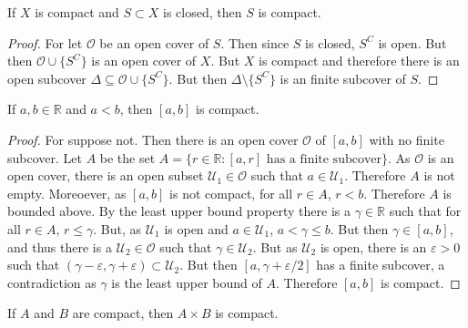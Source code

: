 \documentclass[crop=false,class=book,oneside]{standalone}                      %
\begin{document}
            \begin{theorem}
                If $X$ is compact and
                $S\subset{X}$ is closed, then
                $S$ is compact.
            \end{theorem}
            \begin{proof}
                For let $\mathcal{O}$ be an open cover
                of $S$. Then since $S$ is closed, $S^{C}$
                is open. But then $\mathcal{O}\cup\{S^{C}\}$ is an open
                cover of $X$. But $X$ is compact and therefore
                there is an open subcover $\Delta\subseteq\mathcal{O}\cup\{S^{C}\}$.
                But then $\Delta\setminus\{S^{C}\}$ is an finite subcover of $S$.
            \end{proof}
            \begin{theorem}
                If $a,b\in\mathbb{R}$ and $a<b$, then
                $[a,b]$ is compact.
            \end{theorem}
            \begin{proof}
                For suppose not. Then there is an open
                cover $\mathcal{O}$ of $[a,b]$ with no finite
                subcover. Let $A$ be the set
                $A=\{r\in\mathbb{R}:[a,r]%
                     \textrm{ has a finite subcover}\}$.
                As $\mathcal{O}$ is an open cover, there is
                an open subset $\mathcal{U}_{1}\in\mathcal{O}$ such
                that $a\in\mathcal{U}_{1}$. Therefore $A$ is
                not empty. Moreoever, as $[a,b]$ is not compact,
                for all $r\in{A}$, $r<b$. Therefore $A$ is bounded
                above. By the least upper bound property there
                is a $\gamma\in\mathbb{R}$ such that for
                all $r\in{A}$, $r\leq\gamma$. But, as
                $\mathcal{U}_{1}$ is open and $a\in\mathcal{U}_{1}$,
                $a<\gamma\leq{b}$. But then $\gamma\in[a,b]$, and
                thus there is a $\mathcal{U}_{2}\in\mathcal{O}$ such that
                $\gamma\in\mathcal{U}_{2}$. But as $\mathcal{U}_{2}$ is
                open, there is an $\varepsilon>0$ such that
                $(\gamma-\varepsilon,\gamma+\varepsilon)\subset\mathcal{U}_{2}$.
                But then $[a,\gamma+\varepsilon/2]$ has a finite subcover,
                a contradiction as $\gamma$ is the least upper bound
                of $A$. Therefore $[a,b]$ is compact.
            \end{proof}
            \begin{theorem}
                \label{theorem:surgery_theory_product_of_compact_is_compact}
                If $A$ and $B$ are compact, then
                $A\times{B}$ is compact.
            \end{theorem}
\end{document}
